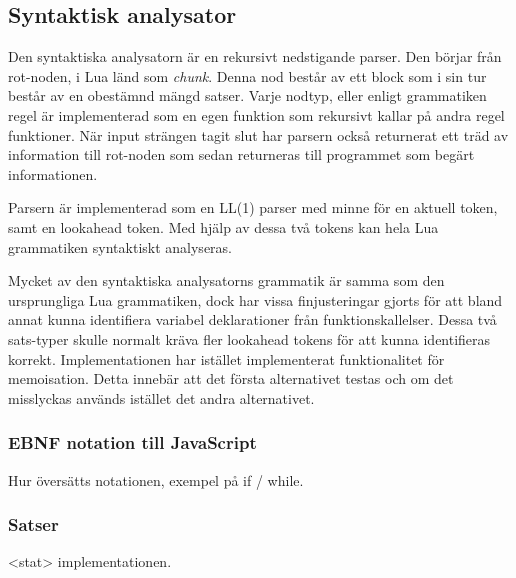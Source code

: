 \subsection{Syntaktisk analysator}

Den syntaktiska analysatorn är en rekursivt nedstigande parser. Den börjar
från rot-noden, i Lua länd som \textit{chunk}. Denna nod består av ett block
som i sin tur består av en obestämnd mängd satser. Varje nodtyp, eller enligt
grammatiken regel är implementerad som en egen funktion som rekursivt kallar
på andra regel funktioner. När input strängen tagit slut har parsern också
returnerat ett träd av information till rot-noden som sedan returneras till
programmet som begärt informationen.

Parsern är implementerad som en LL(1) parser med minne för en aktuell token,
samt en lookahead token. Med hjälp av dessa två tokens kan hela Lua
grammatiken syntaktiskt analyseras.

Mycket av den syntaktiska analysatorns grammatik är samma som den ursprungliga
Lua grammatiken, dock har vissa finjusteringar gjorts för att bland annat
kunna identifiera variabel deklarationer från funktionskallelser. Dessa två
sats-typer skulle normalt kräva fler lookahead tokens för att kunna
identifieras korrekt. Implementationen har istället implementerat
funktionalitet för memoisation. Detta innebär att det första alternativet
testas och om det misslyckas används istället det andra alternativet.

\subsubsection{EBNF notation till JavaScript}

Hur översätts notationen, exempel på if / while.

\subsubsection{Satser}

<stat> implementationen.

%
%

